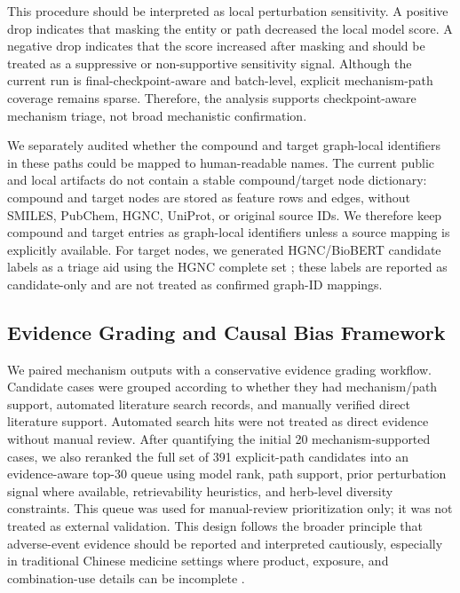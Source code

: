 \documentclass[manuscript,screen,review]{acmart}
\begin{document}
This procedure should be interpreted as local perturbation sensitivity. A positive drop indicates that masking the entity or path decreased the local model score. A negative drop indicates that the score increased after masking and should be treated as a suppressive or non-supportive sensitivity signal. Although the current run is final-checkpoint-aware and batch-level, explicit mechanism-path coverage remains sparse. Therefore, the analysis supports checkpoint-aware mechanism triage, not broad mechanistic confirmation.

We separately audited whether the compound and target graph-local identifiers in these paths could be mapped to human-readable names. The current public and local artifacts do not contain a stable compound/target node dictionary: compound and target nodes are stored as feature rows and edges, without SMILES, PubChem, HGNC, UniProt, or original source IDs. We therefore keep compound and target entries as graph-local identifiers unless a source mapping is explicitly available. For target nodes, we generated HGNC/BioBERT candidate labels as a triage aid using the HGNC complete set \cite{hgnc_download}; these labels are reported as candidate-only and are not treated as confirmed graph-ID mappings.

\subsection{Evidence Grading and Causal Bias Framework}

We paired mechanism outputs with a conservative evidence grading workflow. Candidate cases were grouped according to whether they had mechanism/path support, automated literature search records, and manually verified direct literature support. Automated search hits were not treated as direct evidence without manual review. After quantifying the initial 20 mechanism-supported cases, we also reranked the full set of 391 explicit-path candidates into an evidence-aware top-30 queue using model rank, path support, prior perturbation signal where available, retrievability heuristics, and herb-level diversity constraints. This queue was used for manual-review prioritization only; it was not treated as external validation. This design follows the broader principle that adverse-event evidence should be reported and interpreted cautiously, especially in traditional Chinese medicine settings where product, exposure, and combination-use details can be incomplete \cite{wu2010recommendations}.
\end{document}
